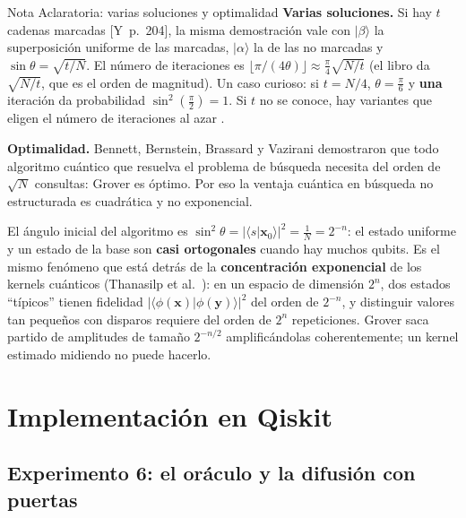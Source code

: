 \documentclass[11pt, a4paper, twoside, openright]{report}
\providecommand{\ket}[1]{|#1\rangle}
\providecommand{\braket}[2]{\langle #1|#2\rangle}
\newcommand{\bx}{\mathbf{x}}
\newcommand{\Yan}[1]{\textcolor{rosaviejo}{\small[Y~#1]}}  %
\begin{document}
\begin{aclaracion}{Nota Aclaratoria: varias soluciones y optimalidad}
\textbf{Varias soluciones.} Si hay $t$ cadenas marcadas \Yan{p.~204}, la misma demostración vale con $\ket{\beta}$ la superposición uniforme de las marcadas, $\ket{\alpha}$ la de las no marcadas y $\sin\theta = \sqrt{t/N}$. El número de iteraciones es $\lfloor\pi/(4\theta)\rfloor\approx\frac{\pi}{4}\sqrt{N/t}$ (el libro da $\sqrt{N/t}$, que es el orden de magnitud). Un caso curioso: si $t = N/4$, $\theta = \frac{\pi}{6}$ y \textbf{una} iteración da probabilidad $\sin^2(\frac{\pi}{2}) = 1$. Si $t$ no se conoce, hay variantes que eligen el número de iteraciones al azar \cite{boyer1998}.

\textbf{Optimalidad.} Bennett, Bernstein, Brassard y Vazirani \cite{bennett1997} demostraron que todo algoritmo cuántico que resuelva el problema de búsqueda necesita del orden de $\sqrt N$ consultas: Grover es óptimo. Por eso la ventaja cuántica en búsqueda no estructurada es cuadrática y no exponencial.
\end{aclaracion}

\begin{tfg}
El ángulo inicial del algoritmo es $\sin^2\theta = |\braket{s}{\bx_0}|^2 = \frac1N = 2^{-n}$: el estado uniforme y un estado de la base son \textbf{casi ortogonales} cuando hay muchos qubits. Es el mismo fenómeno que está detrás de la \textbf{concentración exponencial} de los kernels cuánticos (Thanasilp et al.\ \cite{thanasilp2024exponential}): en un espacio de dimensión $2^n$, dos estados ``típicos'' tienen fidelidad $|\braket{\phi(\mathbf{x})}{\phi(\mathbf{y})}|^2$ del orden de $2^{-n}$, y distinguir valores tan pequeños con disparos requiere del orden de $2^n$ repeticiones. Grover saca partido de amplitudes de tamaño $2^{-n/2}$ amplificándolas coherentemente; un kernel estimado midiendo no puede hacerlo.
\end{tfg}

\cleardoublepage
\section{Implementación en Qiskit}

\subsection{Experimento 6: el oráculo y la difusión con puertas}
\end{document}
